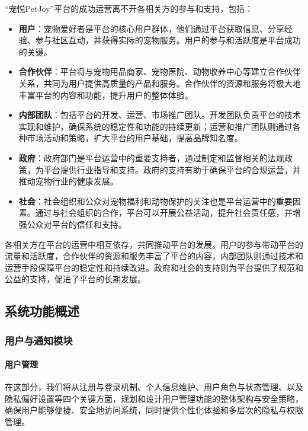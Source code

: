 “宠悦PetJoy”平台的成功运营离不开各相关方的参与和支持，包括：

\begin{itemize}
    \item \textbf{用户}：宠物爱好者是平台的核心用户群体，他们通过平台获取信息、分享经验、参与社区互动，并获得实际的宠物服务。用户的参与和活跃度是平台成功的关键。
    
    \item \textbf{合作伙伴}：平台将与宠物用品商家、宠物医院、动物收养中心等建立合作伙伴关系，共同为用户提供高质量的产品和服务。合作伙伴的资源和服务将极大地丰富平台的内容和功能，提升用户的整体体验。
    
    \item \textbf{内部团队}：包括平台的开发、运营、市场推广团队。开发团队负责平台的技术实现和维护，确保系统的稳定性和功能的持续更新；运营和推广团队则通过各种市场活动和策略，扩大平台的用户基础，提高品牌知名度。
    
    \item \textbf{政府}：政府部门是平台运营中的重要支持者，通过制定和监督相关的法规政策，为平台提供行业指导和支持。政府的支持有助于确保平台的合规运营，并推动宠物行业的健康发展。

    \item \textbf{社会}：社会组织和公众对宠物福利和动物保护的关注也是平台运营中的重要因素。通过与社会组织的合作，平台可以开展公益活动，提升社会责任感，并增强公众对平台的信任和支持。

\end{itemize}

各相关方在平台的运营中相互依存，共同推动平台的发展。用户的参与带动平台的流量和活跃度，合作伙伴的资源和服务丰富了平台的内容，内部团队则通过技术和运营手段保障平台的稳定性和持续改进。政府和社会的支持则为平台提供了规范和公益的支持，促进了平台的长期发展。

\subsection{系统功能概述}

\subsubsection{用户与通知模块}

\paragraph{用户管理}

在这部分，我们将从注册与登录机制、个人信息维护、用户角色与状态管理、以及隐私偏好设置等四个关键方面，规划和设计用户管理功能的整体架构与安全策略，确保用户能够便捷、安全地访问系统，同时提供个性化体验和多层次的隐私与权限管理。

